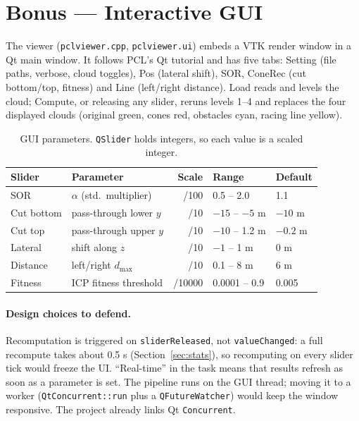 \documentclass[10pt,a4paper]{scrartcl}
\renewcommand{\emph}[1]{\textcolor{accent}{#1}}
\newcommand{\code}[1]{\texttt{#1}}
\newcommand{\file}[1]{\texttt{\small #1}}
\newcommand{\RuleSection}[1]{%
    \section{#1}%
    \vspace{0.2em}{\color{accent!35}\hrule height 0.4pt}\vspace{0.3em}%
  }
\begin{document}
  \RuleSection{Bonus --- Interactive GUI}
  \label{sec:gui}

  The viewer (\file{pclviewer.cpp}, \file{pclviewer.ui}) embeds a VTK render window in
  a Qt main window. It follows PCL's Qt tutorial and has five tabs: \emph{Setting}
  (file paths, verbose, cloud toggles), \emph{Pos} (lateral shift), \emph{SOR},
  \emph{ConeRec} (cut bottom/top, fitness) and \emph{Line} (left/right distance).
  \emph{Load} reads and levels the cloud; \emph{Compute}, or releasing any slider,
  reruns levels 1--4 and replaces the four displayed clouds (original green, cones red,
  obstacles cyan, racing line yellow).

  \begin{table}[H]
  \small
  \centering
  \renewcommand{\arraystretch}{1.05}
  \begin{tabular}{@{}llrll@{}}
  \toprule
  \textbf{Slider} & \textbf{Parameter} & \textbf{Scale} & \textbf{Range} & \textbf{Default} \\
  \midrule
  SOR       & $\alpha$ (std.\ multiplier)  & /100   & 0.5 -- 2.0      & 1.1 \\
  Cut bottom & pass-through lower $y$       & /10    & $-15$ -- $-5$ m  & $-10$ m \\
  Cut top    & pass-through upper $y$       & /10    & $-10$ -- 1.2 m   & $-0.2$ m \\
  Lateral    & shift along $z$              & /10    & $-1$ -- 1 m      & 0 m \\
  Distance   & left/right $d_{\max}$        & /10    & 0.1 -- 8 m       & 6 m \\
  Fitness    & ICP fitness threshold        & /10000 & 0.0001 -- 0.9    & 0.005 \\
  \bottomrule
  \end{tabular}
  \caption{GUI parameters. \code{QSlider} holds integers, so each value is a scaled integer.}
  \label{tab:sliders}
  \end{table}

  \paragraph{Design choices to defend.} Recomputation is triggered on
  \code{sliderReleased}, not \code{valueChanged}: a full recompute takes about 0.5 s
  (Section~\ref{sec:stats}), so recomputing on every slider tick would freeze the UI.
  ``Real-time'' in the task means that results refresh as soon as a parameter is
  set. The pipeline runs on the GUI thread; moving it to a worker
  (\code{QtConcurrent::run} plus a \code{QFutureWatcher}) would keep the window
  responsive. The project already links Qt \code{Concurrent}.
\end{document}
